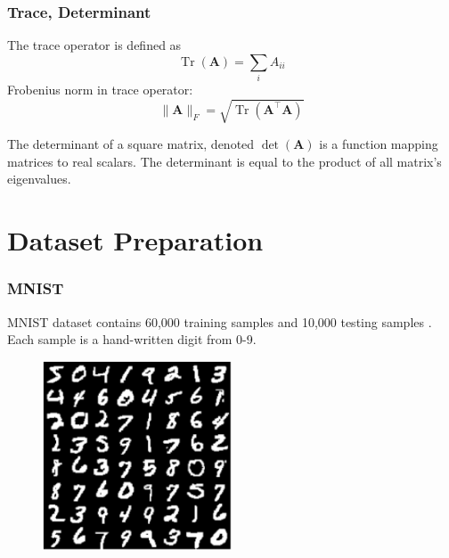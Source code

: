 \documentclass{beamer}
\DeclareMathOperator{\Tr}{Tr}
\begin{document}
\begin{frame}
  \frametitle{Trace, Determinant}

  The trace operator is defined as
  \begin{equation*}
    \Tr(\bm{A})=\sum_{i}A_{ii}
  \end{equation*}
  Frobenius norm in trace operator:
  \begin{equation*}
    \|\bm{A}\|_{F}=\sqrt{\Tr(\bm{A}^{\top}\bm{A})}
  \end{equation*}
  
  The determinant of a square matrix, denoted $\det(\bm{A})$ is a function mapping matrices to real scalars. The determinant is equal to the product of all matrix's eigenvalues.
\end{frame}

\section{Dataset Preparation}

\begin{frame}
    \frametitle{MNIST}

    MNIST dataset contains 60,000 training samples and 10,000 testing samples \cite{lecun1998}. Each sample is a hand-written digit from 0-9.

    \begin{figure}
      \centering
      \includegraphics[width=0.5\textwidth]{mnist.png}
    \end{figure}
\end{frame}
\end{document}
